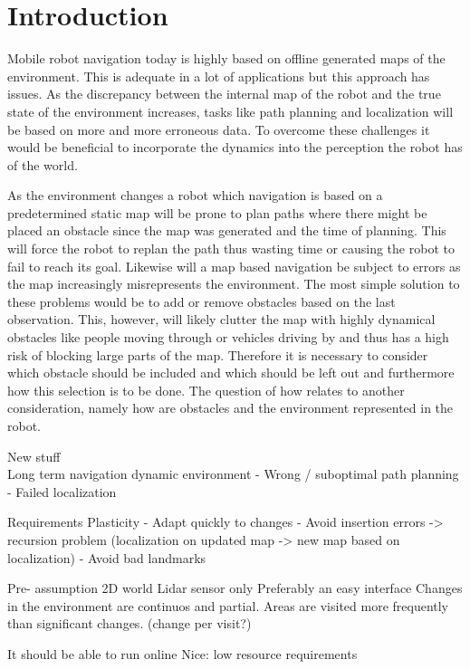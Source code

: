 \chapter{Introduction}

Mobile robot navigation today is highly based on offline generated maps of the environment. This is adequate in a lot of applications but this approach has issues. As the discrepancy between the internal map of the robot and the true state of the environment increases, tasks like path planning and localization will be based on more and more erroneous data. To overcome these challenges it would be beneficial to incorporate the dynamics into the perception the robot has of the world.

As the environment changes a robot which navigation is based on a predetermined static map will be prone to plan paths where there might be placed an obstacle since the map was generated and the time of planning. This will force the robot to replan the path thus wasting time or causing the robot to fail to reach its goal. Likewise will a map based navigation be subject to errors as the map increasingly misrepresents the environment. The most simple solution to these problems would be to add or remove obstacles based on the last observation. This, however, will likely clutter the map with highly dynamical obstacles like people moving through or vehicles driving by and thus has a high risk of blocking large parts of the map. Therefore it is necessary to consider which obstacle should be included and which should be left out and furthermore how this selection is to be done.  The question of how relates to another consideration, namely how are obstacles and the environment represented in the robot.


New stuff\\
Long term navigation dynamic environment
- Wrong / suboptimal path planning
- Failed localization

Requirements
Plasticity
- Adapt quickly to changes 
- Avoid insertion errors -> recursion problem (localization on updated map -> new map based on localization)
- Avoid bad landmarks

Pre- assumption
2D world
Lidar sensor only
Preferably an easy interface 
Changes in the environment are continuos and partial. Areas are visited more frequently than significant changes. (change per visit?)

It should be able to run online
Nice: low resource requirements




